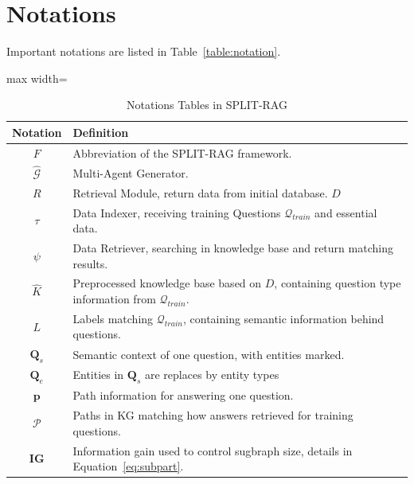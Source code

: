 \documentclass[sigconf]{acmart}
\begin{document}
\appendix

\section{Notations} \label{app:notation}

Important notations are listed in Table~\ref{table:notation}.


\begin{table}[h]
  \centering
  \caption{Notations Tables in SPLIT-RAG}
  \begin{adjustbox}{max width=\textwidth}
    \begin{tabular}{c|l}
      \toprule
      \textbf{Notation} & \textbf{Definition} \\ \midrule\midrule
      $F$ & Abbreviation of the SPLIT-RAG framework. \\ \midrule
      $\hat{\mathcal{G}}$ & Multi-Agent Generator. \\ \midrule
      $R$ & Retrieval Module, return data from initial database. $D$ \\ \midrule
      $\tau$ & Data Indexer, receiving training Questions $\mathcal{Q}_{train}$ and essential data. \\ \midrule
      $\psi$ & Data Retriever, searching in knowledge base and return matching results. \\ \midrule
      $\hat{K}$ & Preprocessed knowledge base based on $D$, containing question type information from $\mathcal{Q}_{train}$.\\ \midrule
      $L$ & Labels matching $\mathcal{Q}_{train}$, containing semantic information behind questions.\\ \midrule
      $\mathbf{Q}_s$ & Semantic context of one question, with entities marked. \\ \midrule
      $\mathbf{Q}_e$ & Entities in $\mathbf{Q}_s$ are replaces by entity types\\ \midrule
      $\mathbf{p}$ & Path information for answering one question. \\ \midrule
      $\mathcal{P}$ & Paths in KG matching how answers retrieved for training questions.\\ \midrule
      $\mathbf{IG}$ & Information gain used to control sugbraph size, details in Equation~\ref{eq:subpart}.\\ \midrule

\end{tabular}
\end{adjustbox}
\end{table}
\end{document}
